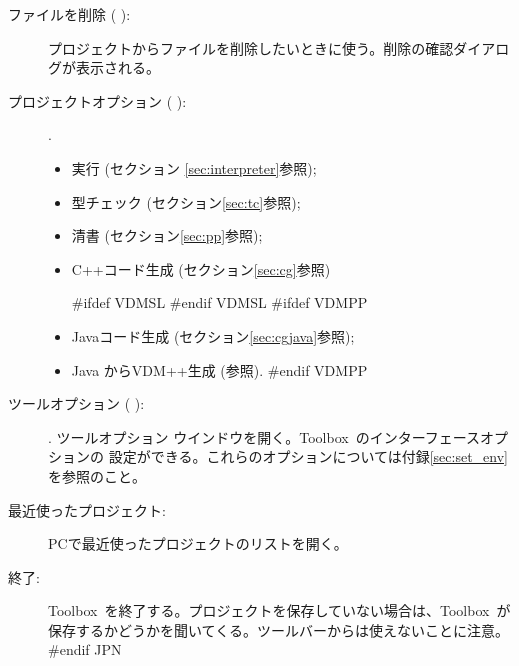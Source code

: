 \documentclass[\pformat,12pt]{article}
\newcommand{\Toolbox}{Toolbox}
\newcommand{\Toolbox}{Toolbox}
\newcommand{\guicmd}[1]{{\sf #1}}
\newcommand{\guicmd}[1]{{\gt #1}}
\begin{document}
\begin{description}
\item[\guicmd{ファイルを削除} (\hspace{-1.5mm}
 ):]
 プロジェクトからファイルを削除したいときに使う。削除の確認ダイアログが表示される。

\item[\guicmd{プロジェクトオプション} (\hspace{-1.5mm}
):].
  \begin{itemize}
    \item \guicmd{実行} (セクション \ref{sec:interpreter}参照);
    \item \guicmd{型チェック}  (セクション\ref{sec:tc}参照);
    \item \guicmd{清書}  (セクション\ref{sec:pp}参照);
    \item \guicmd{C++コード生成} (セクション\ref{sec:cg}参照)

#ifdef VDMSL
#endif VDMSL
#ifdef VDMPP
    \item \guicmd{Javaコード生成}  (セクション\ref{sec:cgjava}参照);
    \item \guicmd{Java からVDM++生成}  (\cite{Java2VDMMan-CSK}参照). 
#endif VDMPP
  \end{itemize}

\item[\guicmd{ツールオプション} (\hspace{-1.5mm}
):].
  \guicmd{ツールオプション} ウインドウを開く。\Toolbox\ のインターフェースオプションの
  設定ができる。これらのオプションについては付録\ref{sec:set_env}を参照のこと。

\item[\guicmd{最近使ったプロジェクト}:]
  PCで最近使ったプロジェクトのリストを開く。

\item[\guicmd{終了}:]
  \Toolbox\ を終了する。プロジェクトを保存していない場合は、\Toolbox\ が
  保存するかどうかを聞いてくる。ツールバーからは使えないことに注意。
#endif JPN

\end{description}
\end{document}
